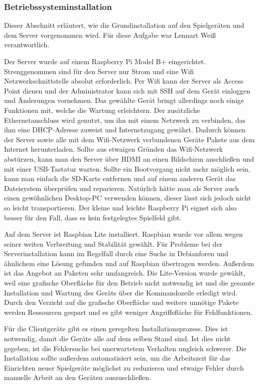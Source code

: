 \subsubsection{Betriebssysteminstallation}
Dieser Abschnitt erläutert, wie die Grundinstallation auf den Spielgeräten und dem Server
vorgenommen wird.
Für diese Aufgabe war Lennart Weiß verantwortlich.

Der Server wurde auf einem Raspberry Pi Model B+ eingerichtet. Strenggenommen
sind für den Server nur Strom und eine Wifi Netzwerkschnittstelle absolut erforderlich. Per
Wifi kann der Server als Access Point dienen und der Administrator kann sich mit
SSH auf dem Gerät einloggen und Änderungen vornehmen. Das gewählte Gerät bringt
allerdings noch einige Funktionen mit, welche die Wartung erleichtern. Der
zusätzliche Ethernetanschluss wird genutzt, um ihn mit einem Netzwerk zu
verbinden, das ihm eine DHCP-Adresse zuweist und Internetzugang gewährt. 
Dadurch können der Server sowie alle mit dem Wifi-Netzwerk verbundenen Geräte
Pakete aus dem Internet herunterladen. Sollte aus etwaigen Gründen das Wifi-Netzwerk
abstürzen, kann man den Server über HDMI an einen Bildschirm
anschließen und mit einer USB-Tastatur warten. Sollte ein Bootvorgang nicht
mehr möglich sein, kann man einfach die SD-Karte entfernen und auf einem anderen
Gerät das Dateisystem überprüfen und reparieren. Natürlich hätte man als Server
auch einen gewöhnlichen Desktop-PC verwenden können, dieser lässt sich jedoch
nicht so leicht transportieren. Der kleine und leichte Raspberry Pi eignet sich
also besser für den Fall, dass es kein festgelegtes Spielfeld gibt.

Auf dem Server ist Raspbian Lite installiert. Raspbian wurde vor allem wegen 
seiner weiten Verbreitung und Stabilität gewählt. Für Probleme bei der 
Serverinstallation kann im Regelfall durch eine Suche in Debianforen und ähnlichem
eine Lösung gefunden und auf Raspbian übertragen werden. Außerdem ist das
Angebot an Paketen sehr umfangreich. Die Lite-Version wurde gewählt, weil eine
grafische Oberfläche für den Betrieb nicht notwendig ist und die gesamte
Installation und Wartung des Geräts über die Kommandozeile erledigt wird.
Durch den Verzicht auf die grafische Oberfläche und weitere unnötige Pakete
werden Ressourcen gespart und es gibt weniger Angriffsfläche für Fehlfunktionen.

Für die Clientgeräte gibt es einen geregelten Installationsprozess. Dies ist
notwendig, damit die Geräte alle auf dem selben Stand sind. Ist dies nicht
gegeben, ist die Fehlersuche bei unerwartetem Verhalten ungleich schwerer. Die
Installation sollte außerdem automatisiert sein, um die Arbeitszeit für das
Einrichten neuer Spielgeräte möglichst zu reduzieren und etwaige Fehler durch
manuelle Arbeit an den Geräten auszuschließen.

